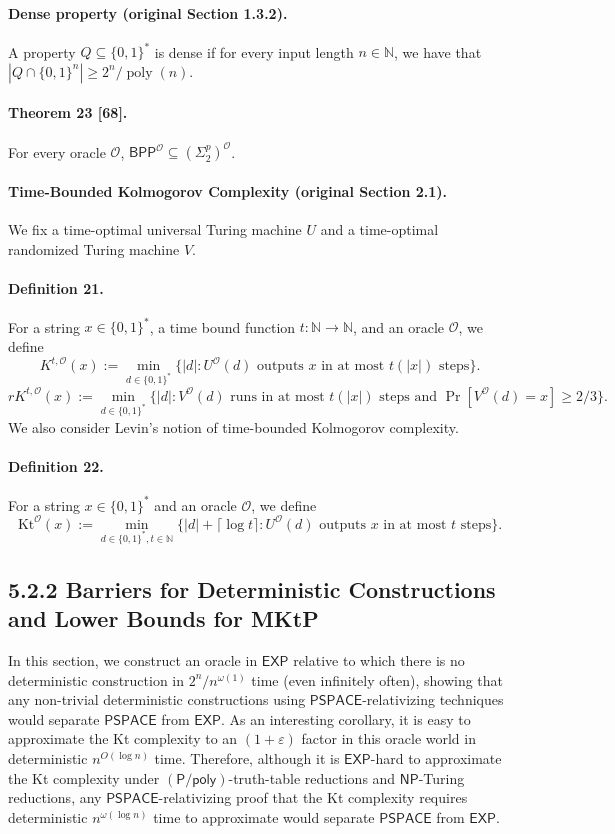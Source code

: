 \documentclass[10pt,a4paper]{article}
\begin{document}
\paragraph{Dense property (original Section 1.3.2).} A property $Q\subseteq\{0,1\}^*$ is dense if for every input length $n\in\mathbb N$, we have that $|Q\cap\{0,1\}^n|\geq2^n/\operatorname{poly}(n)$.
\paragraph{Theorem 23 [68].} For every oracle $\mathcal O$, $\mathsf{BPP}^{\mathcal O}\subseteq(\Sigma^p_2)^{\mathcal O}$.

\paragraph{Time-Bounded Kolmogorov Complexity (original Section 2.1).}
We fix a time-optimal universal Turing machine $U$ and a time-optimal randomized Turing machine $V$.
\paragraph{Definition 21.} For a string $x\in\{0,1\}^*$, a time bound function $t:\mathbb N\to\mathbb N$, and an oracle $\mathcal O$, we define
\[K^{t,\mathcal O}(x):=\min_{d\in\{0,1\}^*}\{|d|:U^{\mathcal O}(d)\text{ outputs }x\text{ in at most }t(|x|)\text{ steps}\}.\]
\[rK^{t,\mathcal O}(x):=\min_{d\in\{0,1\}^*}\{|d|:V^{\mathcal O}(d)\text{ runs in at most }t(|x|)\text{ steps and }\Pr[V^{\mathcal O}(d)=x]\geq2/3\}.\]
We also consider Levin's notion of time-bounded Kolmogorov complexity.
\paragraph{Definition 22.} For a string $x\in\{0,1\}^*$ and an oracle $\mathcal O$, we define
\[\mathrm{Kt}^{\mathcal O}(x):=\min_{d\in\{0,1\}^*,t\in\mathbb N}\{|d|+\lceil\log t\rceil:U^{\mathcal O}(d)\text{ outputs }x\text{ in at most }t\text{ steps}\}.\]
\subsection*{5.2.2 Barriers for Deterministic Constructions and Lower Bounds for MKtP}
In this section, we construct an oracle in $\mathsf{EXP}$ relative to which there is no deterministic construction in $2^n/n^{\omega(1)}$ time (even infinitely often), showing that any non-trivial deterministic constructions using $\mathsf{PSPACE}$-relativizing techniques would separate $\mathsf{PSPACE}$ from $\mathsf{EXP}$.
As an interesting corollary, it is easy to approximate the Kt complexity to an $(1+\varepsilon)$ factor in this oracle world in deterministic $n^{O(\log n)}$ time. Therefore, although it is $\mathsf{EXP}$-hard to approximate the Kt complexity under $(\mathsf{P/poly})$-truth-table reductions and $\mathsf{NP}$-Turing reductions, any $\mathsf{PSPACE}$-relativizing proof that the Kt complexity requires deterministic $n^{\omega(\log n)}$ time to approximate would separate $\mathsf{PSPACE}$ from $\mathsf{EXP}$.
\end{document}
